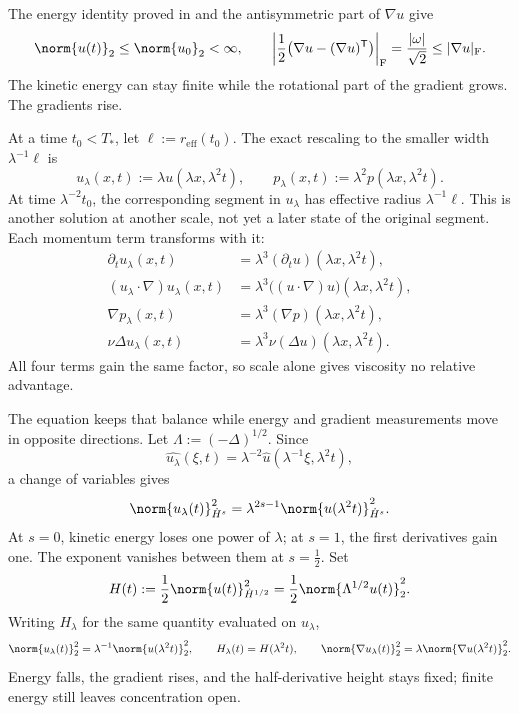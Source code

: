 The energy identity proved in  and the antisymmetric part of \(\nabla u\) give
\[
  \norm{u(t)}_2
  \leq
  \norm{u_0}_2
  <\infty,
  \qquad
  \left|\frac12\bigl(\nabla u-(\nabla u)^{\mathsf T}\bigr)\right|_{\mathrm F}
  =
  \frac{|\omega|}{\sqrt2}
  \leq
  |\nabla u|_{\mathrm F}.
\]
The kinetic energy can stay finite while the rotational part of the gradient grows. The gradients rise.


At a time \(t_0<T_*\), let \(\ell:=r_{\mathrm{eff}}(t_0)\). The exact \NavierStokes{} rescaling to the smaller width \(\lambda^{-1}\ell\) is
\[
  u_\lambda(x,t)
  :=
  \lambda u(\lambda x,\lambda^2t),
  \qquad
  p_\lambda(x,t)
  :=
  \lambda^2p(\lambda x,\lambda^2t).
\]
At time \(\lambda^{-2}t_0\), the corresponding segment in \(u_\lambda\) has effective radius \(\lambda^{-1}\ell\). This is another solution at another scale, not yet a later state of the original segment. Each momentum term transforms with it:
\[
\begin{aligned}
  \partial_tu_\lambda(x,t)
  &=
  \lambda^3(\partial_tu)(\lambda x,\lambda^2t),
  \\
  (u_\lambda\cdot\nabla)u_\lambda(x,t)
  &=
  \lambda^3\bigl((u\cdot\nabla)u\bigr)(\lambda x,\lambda^2t),
  \\
  \nabla p_\lambda(x,t)
  &=
  \lambda^3(\nabla p)(\lambda x,\lambda^2t),
  \\
  \nu\Delta u_\lambda(x,t)
  &=
  \lambda^3\nu(\Delta u)(\lambda x,\lambda^2t).
\end{aligned}
\]
All four terms gain the same factor, so scale alone gives viscosity no relative advantage.


The equation keeps that balance while energy and gradient measurements move in opposite directions. Let \(\Lambda:=(-\Delta)^{1/2}\). Since
\[
  \widehat{u_\lambda}(\xi,t)
  =
  \lambda^{-2}\widehat u(\lambda^{-1}\xi,\lambda^2t),
\]
a change of variables gives
\[
  \norm{u_\lambda(t)}_{\dot H^s}^2
  =
  \lambda^{2s-1}
  \norm{u(\lambda^2t)}_{\dot H^s}^2.
\]
At \(s=0\), kinetic energy loses one power of \(\lambda\); at \(s=1\), the first derivatives gain one. The exponent vanishes between them at \(s=\tfrac12\). Set
\[
  H(t)
  :=
  \frac12\norm{u(t)}_{\dot H^{1/2}}^2
  =
  \frac12\norm{\Lambda^{1/2}u(t)}_2^2.
\]
Writing \(H_\lambda\) for the same quantity evaluated on \(u_\lambda\),
\[
  \norm{u_\lambda(t)}_2^2
  =
  \lambda^{-1}\norm{u(\lambda^2t)}_2^2,
  \qquad
  H_\lambda(t)=H(\lambda^2t),
  \qquad
  \norm{\nabla u_\lambda(t)}_2^2
  =
  \lambda\norm{\nabla u(\lambda^2t)}_2^2.
\]
Energy falls, the gradient rises, and the half-derivative height stays fixed; finite energy still leaves concentration open.

